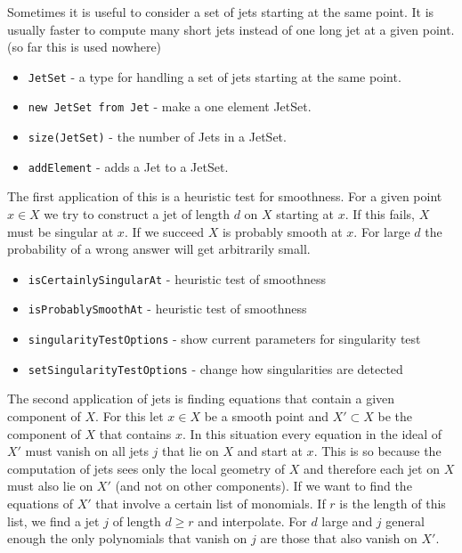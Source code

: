 \documentclass[12pt,a4paper]{amsart}
\theoremstyle{plain}
\theoremstyle{definition}
\begin{document}
Sometimes it is useful to consider a set of jets starting at the same point. It is usually faster to compute many short jets instead of one long jet at a given point. {\color{red} (so far this is used nowhere)}

\begin{itemize}
\item {\tt JetSet} - a type for handling a set of jets starting at the same point.
\item {\tt new JetSet from Jet} - make a one element JetSet.
\item {\tt size(JetSet)} - the number of Jets in a JetSet.
\item {\tt addElement} - adds a Jet to a JetSet.
\end{itemize}

The first application of this is a heuristic test for smoothness. For a given point $x \in X$ we try to construct a jet of length $d$ on $X$ starting at $x$. If this fails, $X$ must be singular at $x$. If we succeed $X$ is probably smooth at $x$. For large $d$ the probability of a wrong answer will get arbitrarily small. 

\begin{itemize}
\item {\tt isCertainlySingularAt} - heuristic test of smoothness
\item {\tt isProbablySmoothAt} - heuristic test of smoothness
\item {\tt singularityTestOptions} - show current parameters for singularity test
\item {\tt setSingularityTestOptions} - change how singularities are detected
\end{itemize}

The second application of jets is finding equations that contain a given component of $X$. For this let $x \in X$ be a smooth point and $X' \subset X$ be the component of $X$ that contains $x$. In this situation every equation in the ideal of $X'$ must vanish on all jets $j$ that lie on $X$ and start at $x$. This is so because the computation of jets sees only the local geometry of $X$ and therefore each jet on $X$ must also lie on $X'$ (and not on other components). If we want to find the equations of $X'$ that involve a certain list of monomials. If $r$ is the length of this list, we find a jet $j$ of length $d \ge r$ and interpolate. For $d$ large and $j$ general enough the only polynomials that vanish on $j$ are those that also vanish on $X'$.
\end{document}
